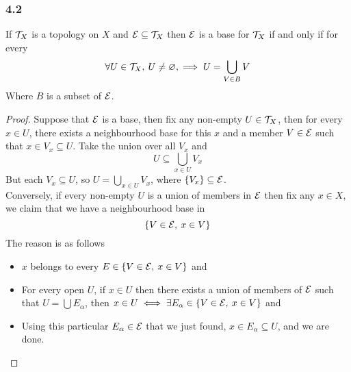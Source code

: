 \documentclass[../../main.tex]{subfiles}
\begin{document}
\subsubsection*{4.2}
\begin{wts}
    If $\mathcal{T}_X$ is a topology on $X$ and $\mathcal{E}\subseteq\mathcal{T}_X$ then $\mathcal{E}$ is a base for $\mathcal{T}_X$ if and only if for every 
    \[
    \forall U\in\mathcal{T}_X,\:U\neq\varnothing,\implies U=\bigcup_{V\in B}V
    \]
    Where $B$ is a subset of $\mathcal{E}$.
\end{wts}
\begin{proof}
    Suppose that $\mathcal{E}$ is a base, then fix any non-empty $U\in\mathcal{T}_X$, then for every $x\in U$, there exists a neighbourhood base for this $x$ and a member $V\in\mathcal{E}$ such that $x\in V_x\subseteq U$. Take the union over all $V_x$ and
    \[
    U\subseteq \bigcup_{x\in U}V_x
    \]
    But each $V_x\subseteq U$, so $U=\bigcup_{x\in U}V_x$, where $\{V_x\}\subseteq\mathcal{E}$.\\
    
    Conversely, if every non-empty $U$ is a union of members in $\mathcal{E}$ then fix any $x\in X$, we claim that we have a neighbourhood base in
    \[
    \{V\in\mathcal{E},\:x\in V\}
    \]
    The reason is as follows
    \begin{itemize}
        \item $x$ belongs to every $E\in \{V\in\mathcal{E},\:x\in V\}$ and
        \item For every open $U$, if $x\in U$ then there exists a union of members of $\mathcal{E}$ such that $U = \bigcup E_\alpha$, then $x\in U\iff\exists
        E_\alpha\in\{V\in\mathcal{E},\: x\in V\}$ and
        \item Using this particular $E_\alpha\in\mathcal{E}$ that we just found, $x\in E_\alpha\subseteq U$, and we are done.
    \end{itemize}
\end{proof}
\end{document}

